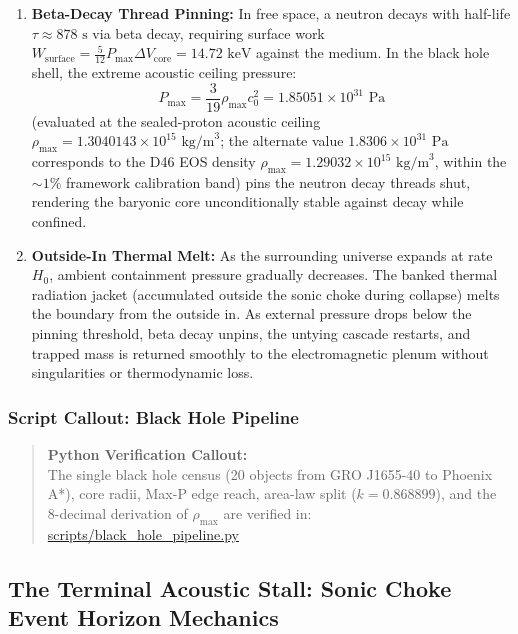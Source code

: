 \documentclass[11pt,a4paper]{article}
\begin{document}
\begin{enumerate}
    \item \textbf{Beta-Decay Thread Pinning:} In free space, a neutron decays with half-life $\tau \approx 878\text{ s}$ via beta decay, requiring surface work $W_{\text{surface}} = \frac{5}{12} P_{\max} \Delta V_{\text{core}} = 14.72\text{ keV}$ against the medium. In the black hole shell, the extreme acoustic ceiling pressure:
    \begin{equation}
    P_{\max} = \frac{3}{19} \rho_{\max} c_0^2 = 1.85051 \times 10^{31}\text{ Pa}
    \label{eq:p_max_ceiling}
    \end{equation}
    (evaluated at the sealed-proton acoustic ceiling $\rho_{\max} = 1.3040143 \times 10^{15}\text{ kg/m}^3$; the alternate value $1.8306 \times 10^{31}\text{ Pa}$ corresponds to the D46 EOS density $\rho_{\max} = 1.29032 \times 10^{15}\text{ kg/m}^3$, within the $\sim 1\%$ framework calibration band) pins the neutron decay threads shut, rendering the baryonic core unconditionally stable against decay while confined.
    \item \textbf{Outside-In Thermal Melt:} As the surrounding universe expands at rate $H_0$, ambient containment pressure gradually decreases. The banked thermal radiation jacket (accumulated outside the sonic choke during collapse) melts the boundary from the outside in. As external pressure drops below the pinning threshold, beta decay unpins, the untying cascade restarts, and trapped mass is returned smoothly to the electromagnetic plenum without singularities or thermodynamic loss.
\end{enumerate}

\subsubsection{Script Callout: Black Hole Pipeline}
\label{subsubsec:callout_pipeline}

\begin{quote}
\textbf{Python Verification Callout:}\\
The single black hole census (20 objects from GRO J1655-40 to Phoenix A*), core radii, Max-P edge reach, area-law split ($k = 0.868899$), and the 8-decimal derivation of $\rho_{\max}$ are verified in:\\
\url{scripts/black_hole_pipeline.py}
\end{quote}

\subsection{The Terminal Acoustic Stall: Sonic Choke Event Horizon Mechanics}
\label{subsec:sonic_choke}
\end{document}
